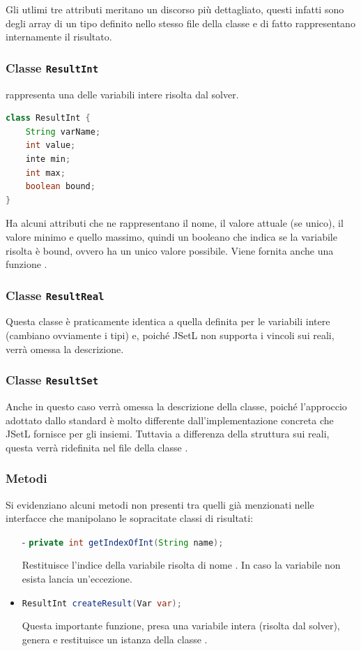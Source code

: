 Gli utlimi tre attributi meritano un discorso più dettagliato, questi infatti 
sono degli array di un tipo definito nello stesso file della classe
 e di fatto rappresentano internamente il risultato.

\subsubsection{Classe \texttt{ResultInt}}
 rappresenta una delle variabili intere risolta dal solver.
\begin{lstlisting}[language = Java,
                   frame = single]
class ResultInt {
	String varName;
	int value;
	inte min;
	int max;
	boolean bound;
}
\end{lstlisting}
Ha alcuni attributi che ne rappresentano il nome, il valore attuale (se 
unico), il valore minimo e quello massimo, quindi un booleano che indica 
se la variabile risolta è bound, ovvero ha un unico valore possibile. 
Viene fornita anche una funzione .

\subsubsection{Classe \texttt{ResultReal}}
Questa classe è praticamente identica a quella definita per le variabili
intere (cambiano ovviamente i tipi) e, poiché JSetL non supporta i vincoli
sui reali, verrà omessa la descrizione.

\subsubsection{Classe \texttt{ResultSet}}
Anche in questo caso verrà omessa la descrizione della classe, poiché
l'approccio adottato dallo standard è molto differente dall'implementazione
concreta che JSetL fornisce per gli insiemi. Tuttavia a differenza della
struttura sui reali, questa verrà ridefinita nel file della classe
.

\subsubsection{Metodi}
Si evidenziano alcuni metodi non presenti tra quelli già menzionati 
nelle interfacce che manipolano le sopracitate classi di risultati:
\begin{itemize}
\item[-]\lstinline[language = Java]$private int getIndexOfInt(String name);$

Restituisce l'indice della variabile risolta di nome . In caso
la variabile non esista lancia un'eccezione.
\item[-]\lstinline[language = Java]$ResultInt createResult(Var var);$

Questa importante funzione, presa una variabile intera (risolta dal solver),
genera e restituisce un istanza della classe .
\end{itemize}

